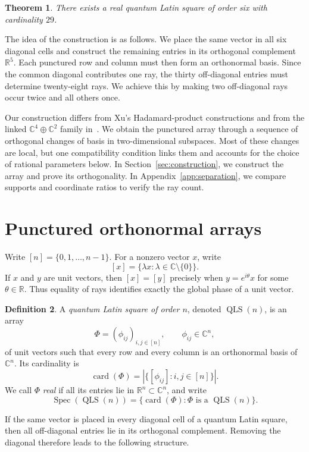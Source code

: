 \documentclass[11pt]{article}
\newtheorem{theorem}{Theorem}[section]
\theoremstyle{definition}
\newtheorem{definition}[theorem]{Definition}
\newcommand{\C}{\mathbb C}
\newcommand{\R}{\mathbb R}
\newcommand{\card}{\operatorname{card}}
\newcommand{\Spec}{\operatorname{Spec}}
\newcommand{\ray}[1]{[#1]}
\begin{document}
\begin{theorem}\label{thm:main}
There exists a real quantum Latin square of order six with cardinality $29$.
\end{theorem}

The idea of the construction is as follows.  We place the same vector in all
six diagonal cells and construct the remaining entries in its orthogonal
complement $\R^5$.  Each punctured row and column must then form an
orthonormal basis.  Since the common diagonal contributes one ray, the thirty
off-diagonal entries must determine twenty-eight rays.  We achieve this by
making two off-diagonal rays occur twice and all others once.

Our construction differs from Xu's Hadamard-product constructions and from
the linked $\C^4\oplus\C^2$ family in~\cite{Xu2026}.  We obtain the punctured
array through a sequence of orthogonal changes of basis in two-dimensional
subspaces.  Most of these changes are local, but one compatibility condition
links them and accounts for the choice of rational parameters below.  In
Section~\ref{sec:construction}, we construct the array and prove
its orthogonality.  In Appendix~\ref{app:separation}, we compare supports and
coordinate ratios to verify the ray count.

\section{Punctured orthonormal arrays}\label{sec:preliminaries}

Write $[n]=\{0,1,\ldots,n-1\}$.  For a nonzero vector $x$, write
\[
\ray{x}=\{\lambda x:\lambda\in\C\setminus\{0\}\}.
\]
If $x$ and $y$ are unit vectors, then $\ray{x}=\ray{y}$ precisely when
$y=e^{i\theta}x$ for some $\theta\in\R$.  Thus equality of rays identifies
exactly the global phase of a unit vector.

\begin{definition}
A \emph{quantum Latin square of order $n$}, denoted $\operatorname{QLS}(n)$,
is an array
\[
\Phi=(\phi_{ij})_{i,j\in[n]},\qquad \phi_{ij}\in\C^n,
\]
of unit vectors such that every row and every column is an orthonormal basis
of $\C^n$.  Its cardinality is
\[
\card(\Phi)=\left|\{\ray{\phi_{ij}}:i,j\in[n]\}\right|.
\]
We call $\Phi$ \emph{real} if all its entries lie in
$\R^n\subset\C^n$, and write
\[
\Spec(\operatorname{QLS}(n))
=\{\card(\Phi):\Phi\text{ is a }\operatorname{QLS}(n)\}.
\]
\end{definition}

If the same vector is placed in every diagonal cell of a quantum Latin
square, then all off-diagonal entries lie in its orthogonal complement.
Removing the diagonal therefore leads to the following structure.
\end{document}
